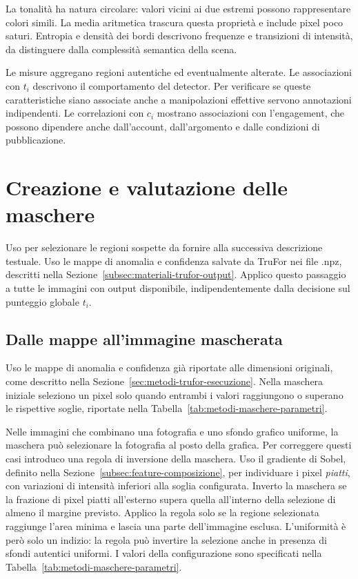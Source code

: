 La tonalità ha natura circolare: valori vicini ai due estremi possono rappresentare colori simili. La media aritmetica trascura questa proprietà e include pixel poco saturi. Entropia e densità dei bordi descrivono frequenze e transizioni di intensità, da distinguere dalla complessità semantica della scena.

Le misure aggregano regioni autentiche ed eventualmente alterate. Le associazioni con $t_i$ descrivono il comportamento del detector. Per verificare se queste caratteristiche siano associate anche a manipolazioni effettive servono annotazioni indipendenti. Le correlazioni con $c_i$ mostrano associazioni con l’engagement, che possono dipendere anche dall’account, dall’argomento e dalle condizioni di pubblicazione.

\section{Creazione e valutazione delle maschere}
\label{sec:metodi-maschere}

Uso  per selezionare le regioni sospette da fornire alla successiva descrizione testuale. Uso le mappe di anomalia e confidenza salvate da TruFor nei file .npz, descritti nella Sezione~\ref{subsec:materiali-trufor-output}. Applico questo passaggio a tutte le immagini con output disponibile, indipendentemente dalla decisione sul punteggio globale $t_i$.

\subsection{Dalle mappe all'immagine mascherata}
\label{subsec:metodi-maschere-creazione}

Uso le mappe di anomalia e confidenza già riportate alle dimensioni originali, come descritto nella Sezione~\ref{sec:metodi-trufor-esecuzione}. Nella maschera iniziale seleziono un pixel solo quando entrambi i valori raggiungono o superano le rispettive soglie, riportate nella Tabella~\ref{tab:metodi-maschere-parametri}.

Nelle immagini che combinano una fotografia e uno sfondo grafico uniforme, la maschera può selezionare la fotografia al posto della grafica. Per correggere questi casi introduco una regola di inversione della maschera. Uso il gradiente di Sobel, definito nella Sezione~\ref{subsec:feature-composizione}, per individuare i pixel \emph{piatti}, con variazioni di intensità inferiori alla soglia configurata. Inverto la maschera se la frazione di pixel piatti all'esterno supera quella all'interno della selezione di almeno il margine previsto. Applico la regola solo se la regione selezionata raggiunge l'area minima e lascia una parte dell'immagine esclusa. L'uniformità è però solo un indizio: la regola può invertire la selezione anche in presenza di sfondi autentici uniformi. I valori della configurazione sono specificati nella Tabella~\ref{tab:metodi-maschere-parametri}.

